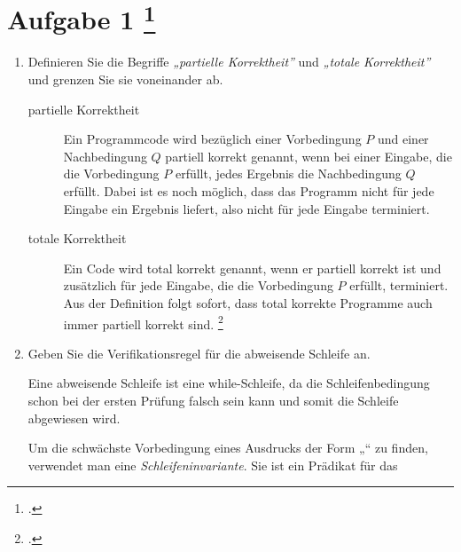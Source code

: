 \documentclass{lehramt-informatik-aufgabe}
\begin{document}
\let\wp=\liWpKalkuel
\let\equivalent=\liWpEquivalent
\let\erklaerung=\liWpErklaerung

\section{Aufgabe 1
\footcite{examen:66116:2020:09}}

\begin{enumerate}


\item Definieren Sie die Begriffe \emph{„partielle Korrektheit”} und
\emph{„totale Korrektheit”} und grenzen Sie sie voneinander ab.

\begin{liAntwort}
\begin{description}
\item[partielle Korrektheit]

Ein Programmcode wird bezüglich einer Vorbedingung $P$ und einer
Nachbedingung $Q$ partiell korrekt genannt, wenn bei einer Eingabe, die
die Vorbedingung $P$ erfüllt, jedes Ergebnis die Nachbedingung $Q$
erfüllt. Dabei ist es noch möglich, dass das Programm nicht für jede
Eingabe ein Ergebnis liefert, also nicht für jede Eingabe terminiert.

\item[totale Korrektheit]

Ein Code wird total korrekt genannt, wenn er partiell korrekt ist und
zusätzlich für jede Eingabe, die die Vorbedingung $P$ erfüllt,
terminiert. Aus der Definition folgt sofort, dass total korrekte
Programme auch immer partiell korrekt sind.
\footcite{wiki:korrektheit}
\end{description}
\end{liAntwort}


\item Geben Sie die Verifikationsregel für die abweisende Schleife
an.

\begin{liAntwort}
Eine abweisende Schleife ist eine while-Schleife, da die
Schleifenbedingung schon bei der ersten Prüfung falsch sein kann und
somit die Schleife abgewiesen wird.

Um die schwächste Vorbedingung eines Ausdrucks der Form
„“ zu finden, verwendet man eine
\emph{Schleifeninvariante}. Sie ist ein Prädikat für das


\end{liAntwort}
\end{enumerate}
\end{document}
